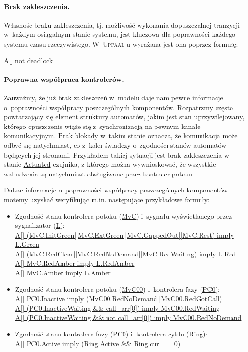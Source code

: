 \documentclass{pracamgr}
\newcommand{\upp}{\textsc{Uppaal}}
\theoremstyle{plain}
\begin{document}
\paragraph{Brak zakleszczenia.} Własność braku zakleszczenia,
tj. możliwość wykonania dopuszczalnej tranzycji w~każdym osiągalnym
stanie systemu, jest kluczowa dla poprawności każdego systemu czasu
rzeczywistego. W~\upp-u wyrażana jest ona poprzez formułę:
\begin{center}
  \url{A[] not deadlock}
\end{center}

\paragraph{Poprawna współpraca kontrolerów.}
Zauważmy, że już brak zakleszczeń w~modelu daje nam pewne informacje
o~poprawności współpracy poszczególnych komponentów. Rozpatrzmy często
powtarzający się element struktury automatów, jakim jest stan uprzywilejowany,
którego opuszczenie wiąże się z~synchronizacją na pewnym kanale
komunikacyjnym. Brak blokady w~takim stanie oznacza, że
komunikacja może odbyć się natychmiast, co z~kolei świadczy
o~zgodności stanów automatów będących jej stronami. Przykładem takiej
sytuacji jest brak zakleszczenia w stanie \url{Actuated} czujnika,
z którego można wywnioskować, że wszystkie wzbudzenia są natychmiast obsługiwane
przez kontroler potoku.

Dalsze informacje o~poprawności współpracy poszczególnych komponentów
możemy uzyskać weryfikując m.in. następujące przykładowe formuły:

\begin{itemize}
  \item Zgodność stanu kontrolera potoku (\url{MvC}) i~sygnału
  wyświetlanego przez sygnalizator (\url{L}):\\
  \url{A[] (MvC.InitGreen||MvC.ExtGreen||MvC.GappedOut||MvC.Rest) imply L.Green}\\
  \url{A[] (MvC.RedClear||MvC.RedNoDemand||MvC.RedWaiting) imply L.Red}\\
  \url{A[] MvC.RedAmber imply L.RedAmber}\\
  \url{A[] MvC.Amber imply L.Amber}
  \item Zgodność stanu kontrolera potoku (\url{MvC00}) i~kontrolera
  fazy (\url{PC0}):\\
  \url{A[] PC0.Inactive imply (MvC00.RedNoDemand||MvC00.RedGotCall)}\\
  \url{A[] (PC0.InactiveWaiting && call_arr[0]) imply MvC00.RedWaiting}\\
  \url{A[] (PC0.InactiveWaiting && not call_arr[0]) imply MvC00.RedNoDemand}
  \item Zgodność stanu kontrolera fazy (\url{PC0}) i~kontrolera cyklu
  (\url{Ring}): \\
  \url{A[] PC0.Active imply (Ring.Active && Ring.cur == 0)}
\end{itemize}
\end{document}
